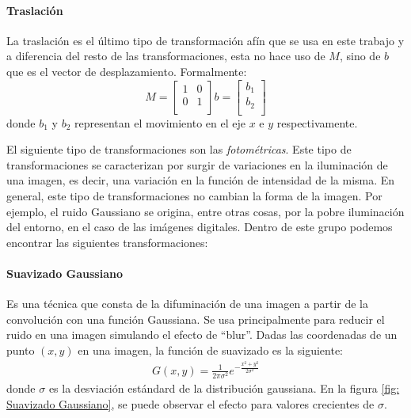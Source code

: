 		\paragraph{Traslación}		
			
			La traslación es el último tipo de transformación afín que se usa en este trabajo y a diferencia del resto de las transformaciones, esta no hace uso de $M$, sino de $b$ que es el vector de desplazamiento. Formalmente:
			\begin{equation*}
				M =  
					\begin{bmatrix}
						1 & 0 \\
						0 & 1  \\
					\end{bmatrix}
					b =
					\begin{bmatrix}
						b_1 \\
						b_2 \\
					\end{bmatrix}	
			\end{equation*}
		donde $b_1$ y $b_2$ representan el movimiento en el eje $x$ e $y$ respectivamente.
		
	El siguiente tipo de transformaciones son las \textit{fotométricas}. Este tipo de transformaciones se caracterizan por surgir de variaciones en la iluminación de una imagen, es decir, una variación en la función de intensidad de la misma. En general, este tipo de transformaciones no cambian la forma de la imagen. Por ejemplo, el ruido Gaussiano se origina, entre otras cosas, por la pobre iluminación del entorno, en el caso de las imágenes digitales. Dentro de este grupo podemos encontrar las siguientes transformaciones:
		
		\paragraph{Suavizado Gaussiano}
		
			Es una técnica que consta de la difuminación de una imagen a partir de la convolución con una función Gaussiana. Se usa principalmente para reducir el ruido en una imagen simulando el efecto de ``blur''. Dadas las coordenadas de un punto $(x, y)$ en una imagen, la función de suavizado es la siguiente:
			\begin{align*}
				G(x,y) = \frac{1}{2\pi\sigma^2}\textit{e}^{-\frac{x^2+y^2}{2\sigma^2}}
			\end{align*}
			donde $\sigma$ es la desviación estándard de la distribución gaussiana. En la figura \ref{fig: Suavizado Gaussiano}, se puede observar el efecto para valores crecientes de $\sigma$.
			

